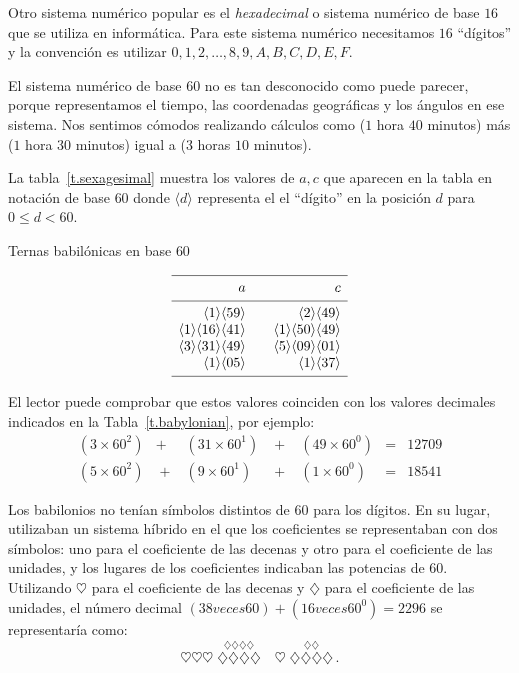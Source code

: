 Otro sistema numérico popular es el \emph{hexadecimal} o sistema numérico de base $16$ que se utiliza en informática. Para este sistema numérico necesitamos $16$ ``dígitos'' y la convención es utilizar $0,1,2,\ldots,8,9,A,B,C,D,E,F$.

El sistema numérico de base $60$ no es tan desconocido como puede parecer, porque representamos el tiempo, las coordenadas geográficas y los ángulos en ese sistema. Nos sentimos cómodos realizando cálculos como ($1$ hora $40$ minutos) más ($1$ hora $30$ minutos) igual a ($3$ horas $10$ minutos).

La tabla~\ref{t.sexagesimal} muestra los valores de $a,c$ que aparecen en la tabla en notación de base $60$ donde $\langle d\rangle$ representa el el ``dígito'' en la posición $d$ para $0\leq d<60$.
\begin{table}[t]
\caption{Ternas babilónicas en base $60$}\label{t.sexagesimal}
\[
\begin{array}{r@{$\quad\quad$}r}
\hline
\noalign{\smallskip}
a&c\\
\noalign{\smallskip}\hline\noalign{\smallskip}
\langle 1\rangle \langle 59 \rangle&\langle 2\rangle \langle 49 \rangle\\
\langle 1\rangle \langle 16 \rangle\langle 41\rangle&\langle 1\rangle \langle 50 \rangle\langle 49\rangle\\
\langle 3\rangle \langle 31 \rangle\langle 49\rangle&\langle 5\rangle \langle 09 \rangle\langle 01\rangle\\
\langle 1\rangle \langle 05 \rangle&\langle 1\rangle \langle 37 \rangle\\
\noalign{\smallskip}\hline
\end{array}
\]
\end{table}
El lector puede comprobar que estos valores coinciden con los valores decimales indicados en la Tabla~\ref{t.babylonian}, por ejemplo:
\[
\renewcommand{\arraystretch}{1.3}
\begin{array}{lclclcr}
(3\times 60^2) &+& (31\times 60^1) &\;+\;& (49\times 60^0) &=&   12709\\
(5\times 60^2) &\;+\;& (9\times 60^1) &\;+\;& (1\times 60^0) &=& 18541
\end{array}
\]

Los babilonios no tenían símbolos distintos de $60$ para los dígitos. En su lugar, utilizaban un sistema híbrido en el que los coeficientes se representaban con dos símbolos: uno para el coeficiente de las decenas y otro para el coeficiente de las unidades, y los lugares de los coeficientes indicaban las potencias de $60$. Utilizando $\heartsuit$ para el coeficiente de las decenas y $\diamondsuit$ para el coeficiente de las unidades, el número decimal $(38 veces 60)+(16 veces 60^0)=2296$ se representaría como:
\[
\heartsuit\heartsuit\heartsuit \; \stackrel{\displaystyle\diamondsuit\diamondsuit\diamondsuit\diamondsuit}{\diamondsuit\diamondsuit\diamondsuit\diamondsuit}
\quad
\heartsuit \; \stackrel{\displaystyle\diamondsuit\diamondsuit}{\diamondsuit\diamondsuit\diamondsuit\diamondsuit}\,.
\]

